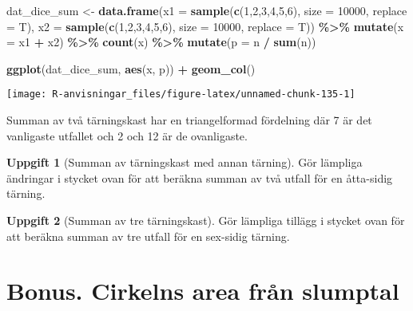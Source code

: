 \documentclass[
]{book}
\newenvironment{Shaded}{\begin{snugshade}}{\end{snugshade}}
\newcommand{\AttributeTok}[1]{\textcolor[rgb]{0.13,0.29,0.53}{#1}}
\newcommand{\DecValTok}[1]{\textcolor[rgb]{0.00,0.00,0.81}{#1}}
\newcommand{\FunctionTok}[1]{\textcolor[rgb]{0.13,0.29,0.53}{\textbf{#1}}}
\newcommand{\NormalTok}[1]{#1}
\newcommand{\OtherTok}[1]{\textcolor[rgb]{0.56,0.35,0.01}{#1}}
\newcommand{\SpecialCharTok}[1]{\textcolor[rgb]{0.81,0.36,0.00}{\textbf{#1}}}
\theoremstyle{definition}
\theoremstyle{definition}
\theoremstyle{definition}
\newtheorem{exercise}{Uppgift}[chapter]
\theoremstyle{definition}
\theoremstyle{remark}
\begin{document}
\begin{Shaded}
\begin{Highlighting}[]
\NormalTok{dat\_dice\_sum }\OtherTok{\textless{}{-}} \FunctionTok{data.frame}\NormalTok{(}\AttributeTok{x1 =} \FunctionTok{sample}\NormalTok{(}\FunctionTok{c}\NormalTok{(}\DecValTok{1}\NormalTok{,}\DecValTok{2}\NormalTok{,}\DecValTok{3}\NormalTok{,}\DecValTok{4}\NormalTok{,}\DecValTok{5}\NormalTok{,}\DecValTok{6}\NormalTok{), }\AttributeTok{size =} \DecValTok{10000}\NormalTok{, }\AttributeTok{replace =}\NormalTok{ T),}
                           \AttributeTok{x2 =} \FunctionTok{sample}\NormalTok{(}\FunctionTok{c}\NormalTok{(}\DecValTok{1}\NormalTok{,}\DecValTok{2}\NormalTok{,}\DecValTok{3}\NormalTok{,}\DecValTok{4}\NormalTok{,}\DecValTok{5}\NormalTok{,}\DecValTok{6}\NormalTok{), }\AttributeTok{size =} \DecValTok{10000}\NormalTok{, }\AttributeTok{replace =}\NormalTok{ T)) }\SpecialCharTok{\%\textgreater{}\%} 
  \FunctionTok{mutate}\NormalTok{(}\AttributeTok{x =}\NormalTok{ x1 }\SpecialCharTok{+}\NormalTok{ x2) }\SpecialCharTok{\%\textgreater{}\%} 
  \FunctionTok{count}\NormalTok{(x) }\SpecialCharTok{\%\textgreater{}\%} 
  \FunctionTok{mutate}\NormalTok{(}\AttributeTok{p =}\NormalTok{ n }\SpecialCharTok{/} \FunctionTok{sum}\NormalTok{(n))}

\FunctionTok{ggplot}\NormalTok{(dat\_dice\_sum, }\FunctionTok{aes}\NormalTok{(x, p)) }\SpecialCharTok{+}
  \FunctionTok{geom\_col}\NormalTok{()}
\end{Highlighting}
\end{Shaded}

\begin{center}\texttt{[image: R-anvisningar\_files/figure-latex/unnamed-chunk-135-1]} \end{center}

Summan av två tärningskast har en triangelformad fördelning där 7 är det vanligaste utfallet och 2 och 12 är de ovanligaste.

\begin{exercise}[Summan av tärningskast med annan tärning]
Gör lämpliga ändringar i stycket ovan för att beräkna summan av två utfall för en åtta-sidig tärning.
\end{exercise}

\begin{exercise}[Summan av tre tärningskast]
Gör lämpliga tillägg i stycket ovan för att beräkna summan av tre utfall för en sex-sidig tärning.
\end{exercise}

\hypertarget{bonus.-cirkelns-area-fruxe5n-slumptal}{%
\section{Bonus. Cirkelns area från slumptal}\label{bonus.-cirkelns-area-fruxe5n-slumptal}}
\end{document}

